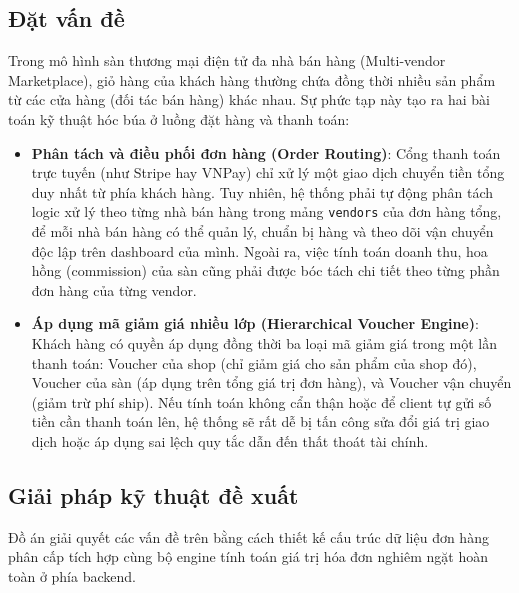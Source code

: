 \documentclass[../DoAn.tex]{subfiles}
\begin{document}
\subsection{Đặt vấn đề}
Trong mô hình sàn thương mại điện tử đa nhà bán hàng (Multi-vendor Marketplace), giỏ hàng của khách hàng thường chứa đồng thời nhiều sản phẩm từ các cửa hàng (đối tác bán hàng) khác nhau. Sự phức tạp này tạo ra hai bài toán kỹ thuật hóc búa ở luồng đặt hàng và thanh toán:
\begin{itemize}
    \item \textbf{Phân tách và điều phối đơn hàng (Order Routing)}: Cổng thanh toán trực tuyến (như Stripe hay VNPay) chỉ xử lý một giao dịch chuyển tiền tổng duy nhất từ phía khách hàng. Tuy nhiên, hệ thống phải tự động phân tách logic xử lý theo từng nhà bán hàng trong mảng \texttt{vendors} của đơn hàng tổng, để mỗi nhà bán hàng có thể quản lý, chuẩn bị hàng và theo dõi vận chuyển độc lập trên dashboard của mình. Ngoài ra, việc tính toán doanh thu, hoa hồng (commission) của sàn cũng phải được bóc tách chi tiết theo từng phần đơn hàng của từng vendor.
    \item \textbf{Áp dụng mã giảm giá nhiều lớp (Hierarchical Voucher Engine)}: Khách hàng có quyền áp dụng đồng thời ba loại mã giảm giá trong một lần thanh toán: Voucher của shop (chỉ giảm giá cho sản phẩm của shop đó), Voucher của sàn (áp dụng trên tổng giá trị đơn hàng), và Voucher vận chuyển (giảm trừ phí ship). Nếu tính toán không cẩn thận hoặc để client tự gửi số tiền cần thanh toán lên, hệ thống sẽ rất dễ bị tấn công sửa đổi giá trị giao dịch hoặc áp dụng sai lệch quy tắc dẫn đến thất thoát tài chính.
\end{itemize}

\subsection{Giải pháp kỹ thuật đề xuất}
Đồ án giải quyết các vấn đề trên bằng cách thiết kế cấu trúc dữ liệu đơn hàng phân cấp tích hợp cùng bộ engine tính toán giá trị hóa đơn nghiêm ngặt hoàn toàn ở phía backend.
\end{document}
